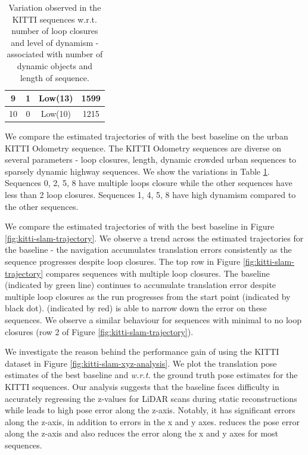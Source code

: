 \begin{table}[]
\begin{tabular}{|c|c|c|c|}
9                         & 1                              & Low(13)     &        1599                                                                         \\ \hline
10                        & 0                              & Low(10)     &        1215                                                                        \\ \hline
\end{tabular}
\caption{Variation observed in the KITTI sequences w.r.t. number of loop closures and level of dynamism - associated with number of dynamic objects and length of sequence.}
\label{tab:kitti-variation}
\end{table}



We compare the estimated trajectories of \dslr{} with the best baseline on the urban KITTI Odometry sequence.
The KITTI Odometry sequences are diverse on several parameters - loop closures, length, dynamic crowded urban sequences to sparsely dynamic highway sequences. We show the variations in Table \ref{tab:kitti-variation}. Sequences 0, 2, 5, 8 have multiple loops closure while the other sequences have less than 2 loop closures. Sequences 1, 4, 5, 8 have high dynamism compared to the other sequences.



We compare the estimated trajectories of \dslr{} with the best baseline in Figure \ref{fig:kitti-slam-trajectory}. We observe a trend across the estimated  trajectories for the baseline - the navigation accumulates translation errors consistently as the sequence progresses despite loop closures. The top row in Figure \ref{fig:kitti-slam-trajectory} compares sequences with multiple loop closures. The baseline (indicated by green line) continues to accumulate translation error despite multiple loop closures as the run progresses from the start point (indicated by black dot). \dslr{} (indicated by red) is able to narrow down the error on these sequences. We observe a similar behaviour for sequences with minimal to no loop closures (row 2 of Figure \ref{fig:kitti-slam-trajectory}).



We investigate the reason behind the performance gain of \dslr{} using the KITTI dataset in Figure \ref{fig:kitti-slam-xyz-analysis}. We  plot the translation pose estimates of the best baseline and \dslr{} \textit{w.r.t.} the ground truth pose estimates for the KITTI sequences. Our analysis suggests that the baseline faces difficulty in accurately regressing the z-values for LiDAR scans during static reconstructions while leads to high pose error along the z-axis. Notably, it has significant errors along the z-axis, in addition to errors in the x and y axes. \dslr{} reduces the pose error along the z-axis and also reduces the error along the x and y axes for most sequences.


